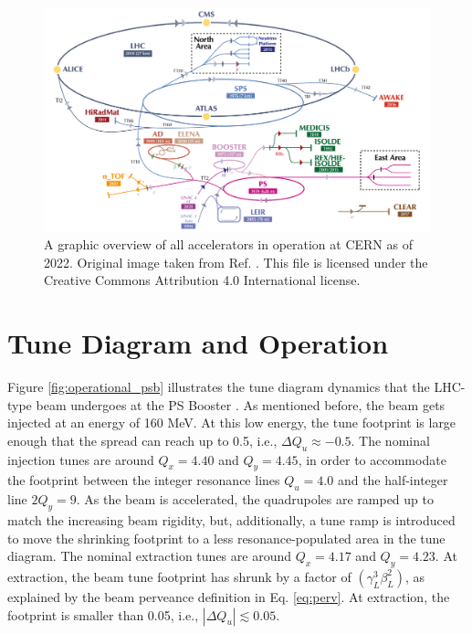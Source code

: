 \begin{figure}[H]
    \centering
    \includegraphics[width=\linewidth]{chapter5/CERN_AC.png}
    \caption{A graphic overview of all accelerators in operation at CERN as of 2022. Original image taken from Ref. \cite{cernplot}. This file is licensed under the Creative Commons Attribution 4.0 International license.}
    \label{fig:cernac}
   \vspace{-1.25em}
\end{figure}

\section{Tune Diagram and Operation}

Figure \ref{fig:operational_psb} illustrates the tune diagram dynamics that the LHC-type beam undergoes at the PS Booster \cite{foteini1,foteini2,albright}. As mentioned before, the beam gets injected at an energy of 160 MeV. At this low energy, the tune footprint is large enough that the spread can reach up to 0.5, i.e., $\Delta Q_u \approx -0.5$. The nominal injection tunes are around $Q_x = 4.40$ and $Q_y = 4.45$, in order to accommodate the footprint between the integer resonance lines $Q_u= 4.0$ and the half-integer line $2Q_y=9$. As the beam is accelerated, the quadrupoles are ramped up to match the increasing beam rigidity, but, additionally, a tune ramp is introduced to move the shrinking footprint to a less resonance-populated area in the tune diagram. The nominal extraction tunes are around $Q_x = 4.17$ and $Q_y = 4.23$. At extraction, the beam tune footprint has shrunk by a factor of $(\gamma_L ^3 \beta_L ^2)$, as explained by the beam perveance definition in Eq. \ref{eq:perv}. At extraction, the footprint is smaller than 0.05, i.e., $| \Delta Q_u | \lesssim 0.05$.      

